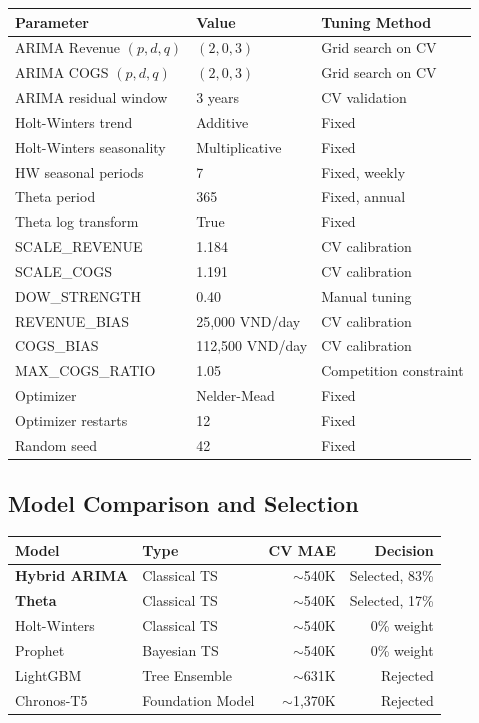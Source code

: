 \documentclass[12pt,a4paper]{article}
\begin{document}
\begin{center}
\centering
{}
\label{tab:hyperparameters}
\small
\begin{tabular}{lll}
\toprule
\textbf{Parameter} & \textbf{Value} & \textbf{Tuning Method} \\
\midrule
ARIMA Revenue $(p,d,q)$ & $(2,0,3)$ & Grid search on CV \\
ARIMA COGS $(p,d,q)$ & $(2,0,3)$ & Grid search on CV \\
ARIMA residual window & 3 years & CV validation \\
Holt-Winters trend & Additive & Fixed \\
Holt-Winters seasonality & Multiplicative & Fixed \\
HW seasonal periods & 7 & Fixed, weekly \\
Theta period & 365 & Fixed, annual \\
Theta log transform & True & Fixed \\
SCALE\_REVENUE & 1.184 & CV calibration \\
SCALE\_COGS & 1.191 & CV calibration \\
DOW\_STRENGTH & 0.40 & Manual tuning \\
REVENUE\_BIAS & 25,000 VND/day & CV calibration \\
COGS\_BIAS & 112,500 VND/day & CV calibration \\
MAX\_COGS\_RATIO & 1.05 & Competition constraint \\
Optimizer & Nelder-Mead & Fixed \\
Optimizer restarts & 12 & Fixed \\
Random seed & 42 & Fixed \\
\bottomrule
\end{tabular}
\end{center}

\subsection{Model Comparison and Selection}
\label{sec:model-comparison-selection}

\begin{center}
\centering
{}
\label{tab:model-comparison}
\small
\begin{tabular}{llrr}
\toprule
\textbf{Model} & \textbf{Type} & \textbf{CV MAE} & \textbf{Decision} \\
\midrule
\textbf{Hybrid ARIMA} & Classical TS & $\sim$540K & Selected, 83\% \\
\textbf{Theta} & Classical TS & $\sim$540K & Selected, 17\% \\
Holt-Winters & Classical TS & $\sim$540K & 0\% weight \\
Prophet & Bayesian TS & $\sim$540K & 0\% weight \\
LightGBM & Tree Ensemble & $\sim$631K & Rejected \\
Chronos-T5 & Foundation Model & $\sim$1,370K & Rejected \\
\bottomrule
\end{tabular}
\end{center}
\end{document}

